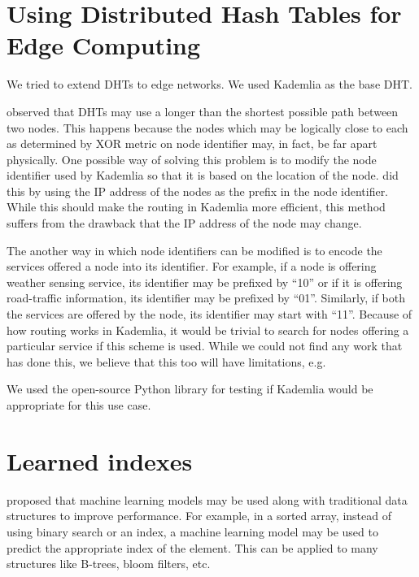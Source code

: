 \section{Using Distributed Hash Tables for Edge Computing}


We tried to extend DHTs to edge networks. We used Kademlia as the base DHT.

\citet{xieEfficientIndexingMechanism2019} observed that DHTs may use a longer
than the shortest possible path between two nodes. This happens because the
nodes which may be logically close to each as determined by XOR metric on node
identifier may, in fact, be far apart physically. One possible way of solving
this problem is to modify the node identifier used by Kademlia so that it is
based on the location of the node. \citet{mengweiImprovementKademliaBased2013}
did this by using the IP address of the nodes as the prefix in the node
identifier. While this should make the routing in Kademlia more efficient, this
method suffers from the drawback that the IP address of the node may change.

The another way in which node identifiers can be modified is to encode the
services offered a node into its identifier. For example, if a node is offering
weather sensing service, its identifier may be prefixed by ``10'' or if it is
offering road-traffic information, its identifier may be prefixed by ``01''.
Similarly, if both the services are offered by the node, its identifier may
start with ``11''. Because of how routing works in Kademlia, it would be trivial
to search for nodes offering a particular service if this scheme is used. While
we could not find any work that has done this, we believe that this too will
have limitations, e.g. 

We used the open-source Python library for testing if Kademlia would be
appropriate for this use case. \cite{KademliaIndexRst}


\section{Learned indexes}

\citet{kraskaCaseLearnedIndex2018a} proposed that machine learning models may be
used along with traditional data structures to improve performance. For example,
in a sorted array, instead of using binary search or an index, a machine
learning model may be used to predict the appropriate index of the element. This
can be applied to many structures like B-trees, bloom filters, etc.

